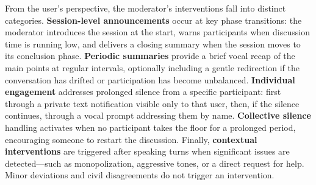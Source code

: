 From the user's perspective, the moderator's interventions fall into distinct categories. \textbf{Session-level announcements} occur at key phase transitions: the moderator introduces the session at the start, warns participants when discussion time is running low, and delivers a closing summary when the session moves to its conclusion phase. \textbf{Periodic summaries} provide a brief vocal recap of the main points at regular intervals, optionally including a gentle redirection if the conversation has drifted or participation has become unbalanced. \textbf{Individual engagement} addresses prolonged silence from a specific participant: first through a private text notification visible only to that user, then, if the silence continues, through a vocal prompt addressing them by name. \textbf{Collective silence} handling activates when no participant takes the floor for a prolonged period, encouraging someone to restart the discussion. Finally, \textbf{contextual interventions} are triggered after speaking turns when significant issues are detected---such as monopolization, aggressive tones, or a direct request for help. Minor deviations and civil disagreements do not trigger an intervention.
